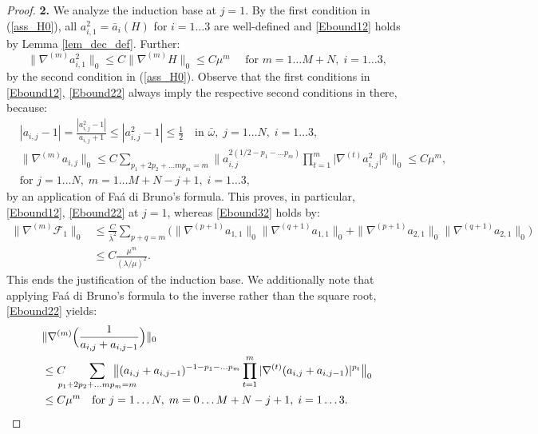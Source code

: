 \documentclass[reqno,twoside,11pt]{amsart}
\numberwithin{equation}{section}
\theoremstyle{plain}
\theoremstyle{definition}
\begin{document}
\begin{proof}
\smallskip

{\bf 2. } We analyze the induction base at $j=1$. By the first
condition in (\ref{ass_H0}), all $a_{i,1}^2=\bar a_i(H)$ for
$i=1\ldots 3$ are well-defined and \ref{Ebound12} holds by Lemma
\ref{lem_dec_def}. Further:
$$\|\nabla^{(m)}a_{i,1}^2\|_0\leq C\|\nabla ^{(m)}H\|_0\leq
C\mu^m\quad\mbox{ for } m=1\ldots M+N,\; i=1\ldots 3,$$
by the second condition in (\ref{ass_H0}). Observe  that the
first conditions in \ref{Ebound12}, \ref{Ebound22} always imply
the respective second conditions in there, because:
\begin{equation*}
\begin{split}
& |a_{i,j} - 1|=\frac{|a_{i,j}^2 - 1|}{a_{i,j} + 1}\leq |a_{i,j}^2 -
1|\leq \frac{1}{2} \quad\mbox{in } \bar\omega,\;j=1\ldots N, \; i=1\ldots 3,\\
& \|\nabla^{(m)} a_{i,j}\|_0\leq C\sum_{p_1+2p_2+\ldots
  mp_m=m} \Big\|
a_{i,j}^{2(1/2-p_1-\ldots p_m)}\prod_{t=1}^m\big|\nabla^{(t)}a_{i,j}^2\big|^{p_t}\Big\|_0
\leq C\mu^m, \\ & %
\mbox{for } j=1\ldots N, \; m=1\ldots M+N-j+1,\; i=1\ldots 3,
\end{split}
\end{equation*}
by an application of Fa\'a di Bruno's formula. This proves, in
particular, \ref{Ebound12}, \ref{Ebound22} at $j=1$, whereas \ref{Ebound32}  holds by:
\begin{equation*}
\begin{split}
\|\nabla^{(m)}\mathcal{F}_1\|_0&\leq
\frac{C}{\bar\lambda^2}\sum_{p+q=m} \big(\|\nabla^{(p+1)}a_{1,1}\|_0 \|\nabla^{(q+1)}a_{1,1}\|_0
+ \|\nabla^{(p+1)}a_{2,1}\|_0 \|\nabla^{(q+1)}a_{2,1}\|_0\big)\\ & \leq
C\frac{\mu^m}{(\lambda/\mu)^2}.
\end{split}
\end{equation*}
This ends the justification of the induction base.
We additionally note that applying Fa\'a di Bruno's formula to the
inverse rather than the square root, \ref{Ebound22} yields: 
\begin{equation}\label{asm2}
\begin{split}
& \|\nabla^{(m)}\Big(\frac{1}{a_{i,j}+a_{i,j-1}}\Big)\|_0  \\ & \leq C\hspace{-3mm} \sum_{p_1+2p_2+\ldots
  mp_m=m}\hspace{-8mm}\big\|(a_{i,j}+a_{i,j-1})^{-1-p_1-\ldots p_m}
\prod_{t=1}^m|\nabla^{(t)}(a_{i,j}+a_{i,j-1})|^{p_t}\big\|_0\\ & \leq C\mu^m
\quad\mbox{for } j=1\ldots N, \; m=0\ldots M+N-j+1,\; i=1\ldots 3.
\end{split}
\end{equation}


\end{proof}
\end{document}
